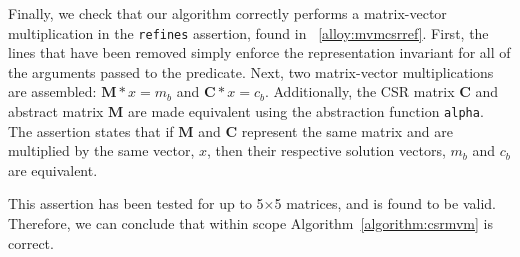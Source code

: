 Finally, we check that our algorithm correctly performs a matrix-vector multiplication in the \texttt{refines} assertion, found in \figurename~\ref{alloy:mvmcsrref}.  First, the lines that have been removed simply enforce the representation invariant for all of the arguments passed to the predicate.  Next, two matrix-vector multiplications are assembled: $\bm{M} * x = m_b$ and $\bm{C} * x = c_b$.  Additionally, the CSR matrix $\bm{C}$ and abstract matrix $\bm{M}$ are made equivalent using the abstraction function \texttt{alpha}.
The assertion states that if $\bm{M}$ and $\bm{C}$ represent the same matrix and are multiplied by the same vector, $x$, then their respective solution vectors, $m_b$ and $c_b$ are equivalent.

This assertion has been tested for up to 5$\times$5 matrices, and is found to be valid.  Therefore, we can conclude that within scope Algorithm~\ref{algorithm:csrmvm} is correct.